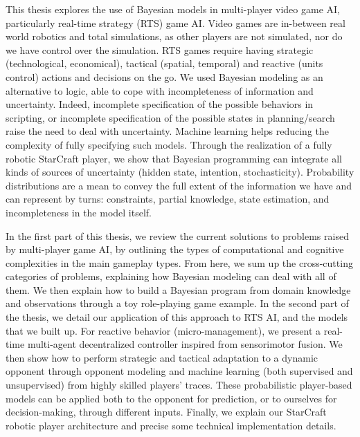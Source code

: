 This thesis explores the use of Bayesian models in multi-player video game AI, particularly real-time strategy (RTS) game AI. Video games are in-between real world robotics and total simulations, as other players are not simulated, nor do we have control over the simulation. RTS games require having strategic (technological, economical), tactical (spatial, temporal) and reactive (units control) actions and decisions on the go. %
We used Bayesian modeling as an alternative to logic, able to cope with incompleteness of information and uncertainty. %
Indeed, incomplete specification of the possible behaviors in scripting, or incomplete specification of the possible states in planning/search raise the need to deal with uncertainty. Machine learning helps reducing the complexity of fully specifying such models. 
Through the realization of a fully robotic StarCraft player, we show that Bayesian programming can integrate all kinds of sources of uncertainty (hidden state, intention, stochasticity). Probability distributions are a mean to convey the full extent of the information we have %
and can represent by turns: constraints, partial knowledge, state estimation, and incompleteness in the model itself.

In the first part of this thesis, we review the current solutions to problems raised by multi-player game AI, by outlining the types of computational and cognitive complexities in the main gameplay types. From here, we sum up the cross-cutting categories of problems, explaining how Bayesian modeling can deal with all of them. We then explain how to build a Bayesian program from domain knowledge and observations through a toy role-playing game example. In the second part of the thesis, we detail our application of this approach to RTS AI, and the models that we built up. For reactive behavior (micro-management), we present a real-time multi-agent decentralized controller inspired from sensorimotor fusion. We then show how to perform strategic and tactical adaptation to a dynamic opponent through opponent modeling and machine learning (both supervised and unsupervised) from highly skilled players' traces. These probabilistic player-based models can be applied both to the opponent for prediction, or to ourselves for decision-making, through different inputs. Finally, we explain our StarCraft robotic player architecture and precise some technical implementation details.

